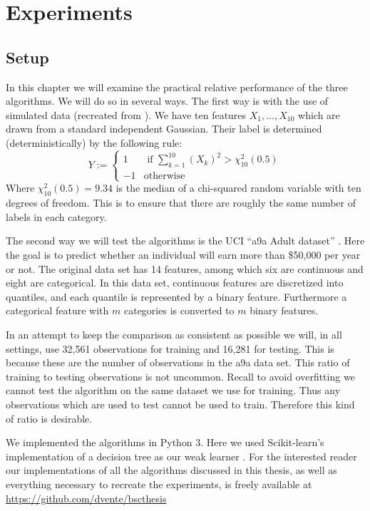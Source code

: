 
\chapter{Experiments}
\label{chap:pracPerf}
\section{Setup}
\label{sec:Setup}
In this chapter we will examine the practical relative performance of the three algorithms. We will do so in several ways. The first way is with the use of simulated data (recreated from \cite{Hastie2009}). We have ten features $X_1,\ldots,X_{10}$ which are drawn from a standard independent Gaussian. Their label is determined (deterministically) by the following rule: $$Y:=\begin{cases}
1 & \text{ if } \sum_{k=1}^{10} (X_k)^2 > \chi_{10}^2(0.5)\\
-1 & \text{otherwise}
\end{cases}$$ Where $\chi_{10}^2(0.5)=9.34$ is the median of a chi-squared random variable with ten degrees of freedom. This is to ensure that there are roughly the same number of labels in each category. 

\par The second way we will test the algorithms is the UCI ``a9a Adult dataset'' \cite{LIBSVM}. Here the goal is to predict whether an individual will earn more than \$50,000 per year or not. The original data set has 14 features, among which six are continuous and eight are categorical. In this data set, continuous features are discretized into quantiles, and each quantile is represented by a binary feature. Furthermore a categorical feature with $m$ categories is converted to $m$ binary features. 

\par In an attempt to keep the comparison as consistent as possible we will, in all settings, use 32,561 observations for training and 16,281 for testing. This is because these are the number of observations in the a9a data set. This ratio of training to testing observations is not uncommon. Recall to avoid overfitting we cannot test the algorithm on the same dataset we use for training. Thus any observations which are used to test cannot be used to train. Therefore this kind of ratio is desirable.

\par We implemented the algorithms in Python 3. Here we used Scikit-learn's implementation of a decision tree as our weak learner \cite{Pedregosa2012}. For the interested reader our implementations of all the algorithms discussed in this thesis, as well as everything necessary to recreate the experiments, is freely available at \url{https://github.com/dvente/bscthesis} 


